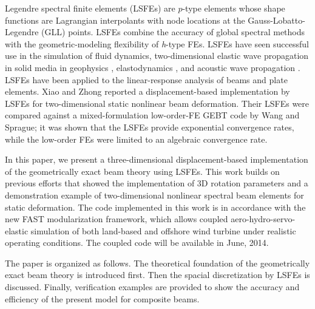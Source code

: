 Legendre spectral finite elements\cite{Patera:1984,Ronquist:1987} (LSFEs)
are $p$-type elements whose shape functions are Lagrangian
interpolants with node locations at the Gauss-Lobatto-Legendre (GLL) points.
LSFEs combine the accuracy of global spectral methods with the
geometric-modeling
flexibility of {\it h}-type FEs. LSFEs have seen successful use
in the simulation of fluid dynamics\cite{Ronquist:1987, Patera:1984,
Deville:2002}, two-dimensional elastic wave propagation in solid media in
geophysics \cite{Komatitsch:1998}, elastodynamics \cite{Sridhar:2006}, and
acoustic wave propagation \cite{Sprague:2004}. LSFEs have been applied to
the linear-response analysis of
beams\cite{Ben-Tal-etal:1995,Ben-Tal-etal:1996,Kudela-etal:2007a,Sprague-Geers:2008,Wang:SFE2013}
and plate elements\cite{Zrahia-Bar-Yoseph:1995,
Kudela-etal:2007b,Sprague-Brito:2012}. Xiao and Zhong \cite{Xiao-Zhong:2012} reported  a displacement-based implementation by LSFEs for two-dimensional static nonlinear beam deformation. Their
LSFEs were compared against a mixed-formulation
low-order-FE GEBT code by Wang and
Sprague\cite{Wang:SFE2013};  it was shown that the LSFEs provide
exponential convergence rates, while the low-order FEs were limited to
an algebraic convergence rate.

In this paper, we present a three-dimensional displacement-based
implementation of the geometrically exact beam theory using LSFEs.  This work
builds on previous efforts that showed the implementation of 3D rotation
parameters\cite{Wang:GEBT2013} and a demonstration example of
two-dimensional nonlinear spectral beam elements\cite{Wang:SFE2013} for
static deformation.  The code implemented in this work is in accordance with
the new FAST modularization framework\cite{Jonkman:2013},  which allows coupled aero-hydro-servo-elastic simulation of both land-based and offshore wind turbine under realistic operating conditions. The coupled code will be available in June, 2014.

The paper is organized as follows.  The theoretical foundation of the
geometrically exact beam theory is introduced first. Then the spacial
discretization by LSFEs is discussed. Finally, verification examples are
provided to show the accuracy and efficiency of the present model  for
composite beams.  



